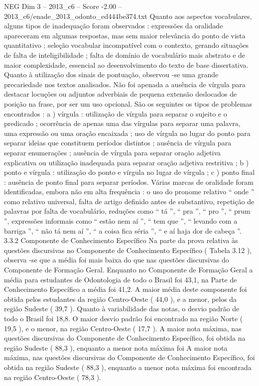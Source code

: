 \begin{textsample}{NEG Dim 3 – 2013\_c6 – Score -2.00 – 2013\_c6/enade\_2013\_odonto\_ed444be374.txt}
Quanto aos aspectos vocabulares, alguns tipos de inadequação foram observados : expressões da oralidade apareceram em algumas respostas, mas sem maior relevância do ponto de vista quantitativo ; seleção vocabular incompatível com o contexto, gerando situações de falta de inteligibilidade ; falta de domínio de vocabulário mais abstrato e de maior complexidade, essencial ao desenvolvimento do texto de base dissertativa.
Quanto à utilização dos sinais de pontuação, observou -se uma grande precariedade nos textos analisados.
Não foi apenada a ausência de vírgula para destacar locuções ou adjuntos adverbiais de pequena extensão deslocados de posição na frase, por ser um uso opcional.
São os seguintes os tipos de problemas encontrados : a ) vírgula : utilização de vírgula para separar o sujeito e o predicado ; ocorrência de apenas uma das vírgulas para separar uma palavra, uma expressão ou uma oração encaixada ; uso de vírgula no lugar do ponto para separar ideias que constituem períodos distintos ; ausência de vírgula para separar enumerações ; ausência de vírgula para separar oração adjetiva explicativa ou utilização inadequada para separar oração adjetiva restritiva ; b ) ponto e vírgula : utilização do ponto e vírgula no lugar de vírgula ; c ) ponto final : ausência de ponto final para separar períodos.
Várias marcas de oralidade foram identificadas, embora não em alta frequência : o uso do pronome relativo “ onde ” como relativo universal, falta de artigo definido antes de substantivo, repetição de palavras por falta de vocabulário, reduções como “ tá ”, “ pra ”, “ pro ”, “ prum ”, expressões informais como “ estão nem aí ”, “ tem que ”, “ levando com a barriga ”, “ não tá nem aí ”, “ a coisa fica séria ”, “ e aí haja dor de cabeça ”. 3.3.2 Componente de Conhecimento Específico Na parte da prova relativa às questões discursivas no Componente de Conhecimento Específico ( Tabela 3.12 ), observa -se que a média foi mais baixa do que nas questões discursivas do Componente de Formação Geral.
Enquanto no Componente de Formação Geral a média para estudantes de Odontologia de todo o Brasil foi 43,1, na Parte de Conhecimento Específico a média foi 41,2.
A maior média deste componente foi obtida pelos estudantes da região Centro-Oeste ( 44,0 ), e a menor, pelos da região Sudeste ( 39,7 ).
Quanto à variabilidade das notas, o desvio padrão de todo o Brasil foi 18,8.
O maior desvio padrão foi encontrado na região Norte ( 19,5 ), e o menor, na região Centro-Oeste ( 17,7 ).
A maior nota máxima, nas questões discursivas do Componente de Conhecimento Específico, foi obtida na região Sudeste ( 88,3 ), enquanto a menor nota máxima foi A maior nota máxima, nas questões discursivas do Componente de Conhecimento Específico, foi obtida na região Sudeste ( 88,3 ), enquanto a menor nota máxima foi encontrada na região Centro-Oeste ( 78,3 ).

\end{textsample}
